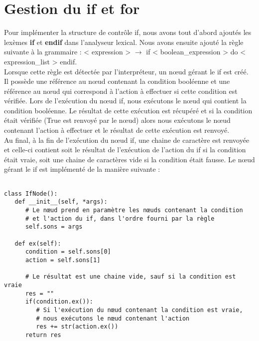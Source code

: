 \documentclass[a4paper,10pt]{article}
\begin{document}
\section{Gestion du \textbf{if} et \textbf{for}}
Pour implémenter la structure de contrôle \textrm{if}, nous avons tout d'abord ajoutés les lexèmes \textbf{if} et \textbf{endif} dans l'analyseur lexical. Nous avons ensuite ajouté la 
règle suivante à la grammaire : < expression > $\rightarrow$ if < boolean\_expression > do < expression\_list > endif. \\
Lorsque cette règle est détectée par l'interpréteur, un nœud gérant le if est créé. Il possède une référence au nœud contenant la condition booléenne et une référence au nœud qui correspond
à l'action à effectuer si cette condition est vérifiée. Lors de l'exécution du nœud \textrm{if}, nous exécutons le nœud qui contient la condition booléenne. Le résultat de cette exécution
est récupéré et si la condition était vérifiée (\textrm{True} est renvoyé par le nœud) alors nous exécutons le nœud contenant l'action à effectuer et le résultat de cette exécution est renvoyé. \\
Au final, à la fin de l'exécution du nœud if, une chaine de caractère est renvoyée et celle-ci contient soit le résultat de l'exécution de l'action du if si la condition était vraie, soit une
chaine de caractères vide si la condition était fausse. 
\newline \newline
Le nœud gérant le \textrm{if} est implémenté de la manière suivante : 
\begin{verbatim}

class IfNode():
   def __init__(self, *args):
      # Le nœud prend en paramètre les nœuds contenant la condition 
      # et l'action du if, dans l'ordre fourni par la règle
      self.sons = args
         
   def ex(self):
      condition = self.sons[0]
      action = self.sons[1]

      # Le résultat est une chaine vide, sauf si la condition est vraie
      res = ""
      if(condition.ex()):
         # Si l'exécution du nœud contenant la condition est vraie, 
         # nous exécutons le nœud contenant l'action
         res += str(action.ex())
      return res
 
\end{verbatim}
\end{document}
